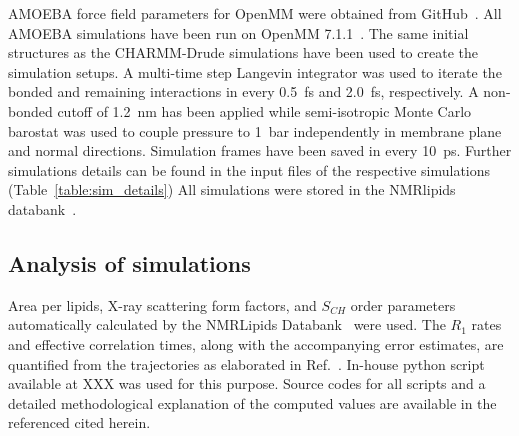 \documentclass[journal=jacsat,manuscript=article,layout=singlecolumn]{achemso}
\begin{document}
AMOEBA force field parameters for OpenMM were obtained from GitHub~\cite{amoebagithub,klesse2020induced}. All AMOEBA simulations have been run on OpenMM 7.1.1~\cite{eastman2017openmm}. The same initial structures as the CHARMM-Drude simulations have been used to create the simulation setups. A multi-time step Langevin integrator was used to iterate the bonded and remaining interactions in every 0.5~fs and 2.0~fs, respectively. A non-bonded cutoff of 1.2~nm has been applied while semi-isotropic Monte Carlo barostat was used to couple pressure to 1~bar independently in membrane plane and normal directions.
Simulation frames have been saved in every 10~ps. Further simulations details can be found in the input files of the respective simulations (Table~\ref{table:sim_details})
All simulations were stored in the NMRlipids databank~\cite{Databank}.

\subsection{Analysis of simulations}

Area per lipids, X-ray scattering form factors, and $S_{CH}$ order parameters automatically calculated by the NMRLipids Databank~\cite{Databank} were used. The $R_{1}$ rates and effective correlation times, along with the accompanying error estimates, are quantified from the trajectories as elaborated in Ref.~. In-house python script available at XXX was used for this purpose. Source codes for all scripts and a detailed methodological explanation of the computed values are available in the referenced cited herein.
\end{document}

